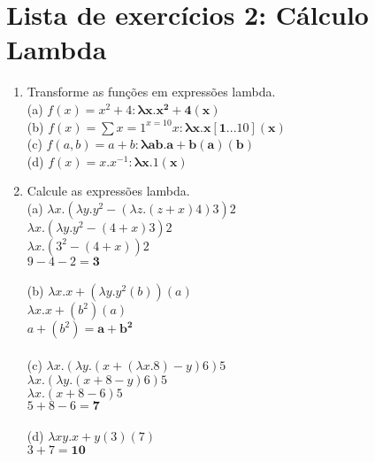 \documentclass{article}
\begin{document}
\section*{Lista de exercícios 2: Cálculo Lambda}
\begin{enumerate}
    \item Transforme as funções em expressões lambda. \\
    (a) $f(x)=x^{2}+4 : \mathbf{\lambda x.x^{2}+4 (x)}$ \\
    (b) $f(x)=\sum{x=1}^{x=10}x : \mathbf{\lambda x.x[1...10] (x)}$ \\
    (c) $f(a, b)=a+b : \mathbf{\lambda ab.a+b (a)(b)}$ \\
    (d) $f(x) = x.x^{-1} : \mathbf{\lambda x.1 (x)}$ \\
    
    \item Calcule as expressões lambda. \\
    (a) $\lambda x.(\lambda y.y^{2} - (\lambda z.(z+x)4)3)2$ \\
    $\lambda x.(\lambda y.y^{2} - (4+x)3)2$ \\
    $\lambda x.(3^{2} - (4+x))2$ \\
    $9 - 4 - 2 = \mathbf{3}$ \\ \\
    (b) $\lambda x.x + (\lambda y.y^{2}(b))(a)$ \\
    $\lambda x.x + (b^{2})(a)$ \\
    $a + (b^{2}) = \mathbf{a+b^{2}}$ \\ \\
    (c) $\lambda x.(\lambda y.(x+(\lambda x.8)-y)6)5$ \\
    $\lambda x.(\lambda y.(x+8-y)6)5$ \\
    $\lambda x.(x+8-6)5$ \\
    $5+8-6 = \mathbf{7}$ \\ \\
    (d) $\lambda xy.x+y (3)(7)$ \\
    $3+7 = \mathbf{10}$
\end{enumerate}
\end{document}
